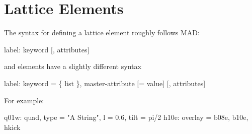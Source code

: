 \section{Lattice Elements}

The syntax for defining a lattice element roughly follows MAD:
\begin{example}
  label: keyword [, attributes]
\end{example}
 and  elements have a slightly different syntax
\begin{example}
  label: keyword = \{ list \}, master-attribute [= value] [, attributes]
\end{example}
For example:
\begin{example}
  q01w: quad, type = "A String", l = 0.6, tilt = pi/2
  h10e: overlay = {b08e, b10e}, hkick
\end{example}
